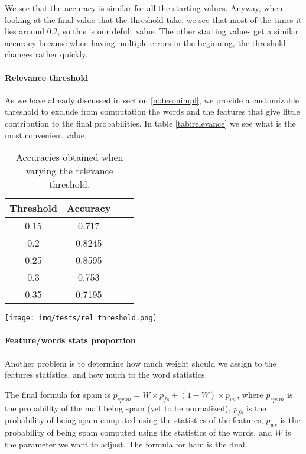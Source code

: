 We see that the accuracy is similar for all the starting values. Anyway, when looking at the final value that the threshold take, we see that most of the times it lies around 0.2, so this is our defult value. The other starting values get a similar accuracy because when having multiple errors in the beginning, the threshold changes rather quickly.

\paragraph{Relevance threshold}
As we have already discussed in section \ref{notesonimpl}, we provide a customizable threshold to exclude from computation the words and the features that give little contribution to the final probabilities. In table \ref{tab:relevance} we see what is the most convenient value.

\begin{center}
\begin{table}[h]
\begin{minipage}{.5\linewidth}
\begin{tabular}{cccc}
\toprule
Threshold & Accuracy\\
\midrule
0.15  & 0.717  \\
0.2   & 0.8245 \\
0.25  & 0.8595 \\
0.3   & 0.753  \\
0.35  & 0.7195 \\
\bottomrule
\end{tabular}
\end{minipage}
\begin{minipage}{.5\linewidth}
\texttt{[image: img/tests/rel\_threshold.png]}
    \label{fig:relthreshold}
\end{minipage}
\caption{Accuracies obtained when varying the relevance threshold.}
\end{table}
\label{tab:relevance}
\end{center}

\paragraph{Feature/words stats proportion}
Another problem is to determine how much weight should we assign to the features statistics, and how much to the word statistics.

The final formula for spam is $p_{spam} = W \times p_{fs} + (1-W) \times p_{ws}$, where $p_{spam}$ is the probability of the mail being spam (yet to be normalized), $p_{fs}$ is the probability of being spam computed using the statistics of the features, $p_{ws}$ is the probability of being spam computed using the statistics of the words, and $W$ is the parameter we want to adjust. The formula for ham is the dual.


